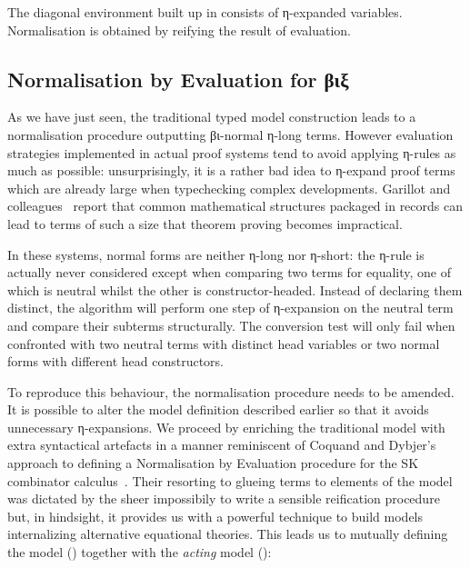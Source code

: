 The diagonal environment built up in  
consists of η-expanded variables. Normalisation is obtained by reifying
the result of evaluation.


\subsection{Normalisation by Evaluation for βιξ}

As we have just seen, the traditional typed model construction leads to a
normalisation procedure outputting βι-normal η-long terms. However evaluation
strategies implemented in actual proof systems tend to avoid applying η-rules
as much as possible: unsurprisingly, it is a rather bad idea to η-expand proof
terms which are already large when typechecking complex developments. Garillot
and colleagues~\cite{garillot2009packaging} report that common mathematical
structures packaged in records can lead to terms of such a size that theorem
proving becomes impractical.

In these systems, normal forms are neither η-long nor η-short: the η-rule is
actually never considered except when comparing two terms for equality, one of
which is neutral whilst the other is constructor-headed. Instead of declaring
them distinct, the algorithm will perform one step of η-expansion on the
neutral term and compare their subterms structurally. The conversion test
will only fail when confronted with two neutral terms with distinct head
variables or two normal forms with different head constructors.

To reproduce this behaviour, the normalisation procedure needs to be amended.
It is possible to alter the model definition described earlier so that it
avoids unnecessary η-expansions. We proceed by enriching the traditional
model with extra syntactical artefacts in a manner reminiscent of Coquand
and Dybjer's approach to defining a Normalisation by Evaluation procedure
for the SK combinator calculus~\cite{CoqDybSK}. Their resorting to glueing
terms to elements of the model was dictated by the sheer impossibily to write
a sensible reification procedure but, in hindsight, it provides us with a
powerful technique to build models internalizing alternative equational
theories. This leads us to mutually defining the model ()
together with the \emph{acting} model ():




